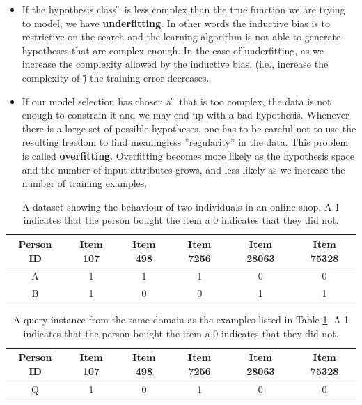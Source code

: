 \documentclass[solution]{ditpaper}
\begin{document}
\begin{enumerate}
\begin{answer}
\begin{itemize}
			\item If the hypothesis class \H~is less complex than the true function we are trying to model, we have \textbf{underfitting}. In other words the inductive bias is to restrictive on the search and the learning algorithm is not able to generate hypotheses that are complex enough. In the case of underfitting, as we increase the complexity allowed by the inductive bias, (i.e., increase the complexity of \H) the training error decreases. 
			\item If our model selection has chosen a \H~that is too complex, the data is not enough to constrain it and we may end up with a bad hypothesis. Whenever there is a large set of possible hypotheses, one has to be careful not to use the resulting freedom to find meaningless ''regularity'' in the data. This problem is called \textbf{overfitting}. Overfitting becomes more likely as the hypothesis space and the number of input attributes grows, and less likely as we increase the number of training examples.
		\end{itemize}
\end{answer}



\end{enumerate}


\newpage

		
\begin{table}[!tb]
\caption{A dataset showing the behaviour of two individuals in an online shop. A 1 indicates that the person bought the item a 0 indicates that they did not.}
\label{table:binaryDataset}
\centering
\begin{tabular}{ | c | c | c | c | c | c |}
\hline
Person ID & Item 107 & Item 498 & Item 7256 & Item 28063 & Item 75328\\
\hline
A  &  1 & 1 & 1 & 0 & 0\\
B  &  1 & 0 & 0 & 1 & 1\\
\hline \hline 
\end{tabular}
\label{tab:binarydata}
\end{table}

\begin{table}[!tb]
\caption{A query instance from the same domain as the examples listed in Table \ref{tab:binarydata}. A 1 indicates that the person bought the item a 0 indicates that they did not.}
\label{table:binaryDataset}
\centering
\begin{tabular}{ | c | c | c | c | c | c |}
\hline
Person ID & Item 107 & Item 498 & Item 7256 & Item 28063 & Item 75328\\
\hline
Q  &  1 & 0 & 1 & 0 & 0\\
\hline \hline 
\end{tabular}
\label{tab:binaryquery}
\end{table}
\end{document}
